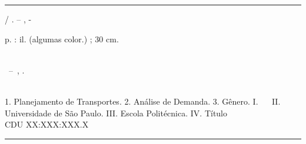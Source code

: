 \documentclass[
  12pt,        %
  openright,      %
  twoside,      %
  a4paper,      %
  english,      %
  brazil        %
]{abntex2}
\begin{document}
\begin{fichacatalografica}
  \vspace*{\fill}          %
  \hrule              %
  \begin{center}          %
  \begin{minipage}[c]{12.5cm}    %

  \imprimirautor

  \hspace{0.5cm} \imprimirtitulo  / \imprimirautor. --
  \imprimirlocal, \imprimirdata-

  \hspace{0.5cm} \pageref{LastPage} p. : il. (algumas color.) ; 30 cm.\\

  \hspace{0.5cm} \imprimirorientadorRotulo~\imprimirorientador\\


  \hspace{0.5cm}
  \parbox[t]{\textwidth}{\imprimirtipotrabalho~--~\imprimirinstituicao,
  \imprimirdata.}\\

  \hspace{0.5cm} 
    1. Planejamento de Transportes.
    2. Análise de Demanda.
    3. Gênero.
    I. \imprimirorientadorRotulo~\imprimirorientador~
    II. Universidade de São Paulo.
    III. Escola Politécnica.
    IV. Título\\

  \hspace{8.75cm} CDU XX:XXX:XXX.X\\ %

  \end{minipage}
  \end{center}
  \hrule
\end{fichacatalografica}

\end{document}
